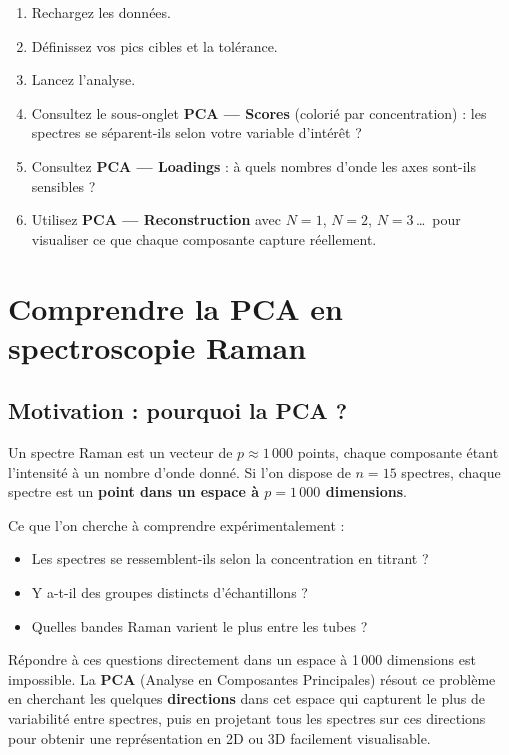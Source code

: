 \documentclass[12pt, a4paper]{article}
\begin{document}
\begin{enumerate}
  \item Rechargez les données.
  \item Définissez vos pics cibles et la tolérance.
  \item Lancez l'analyse.
  \item Consultez le sous-onglet \textbf{PCA --- Scores} (colorié par
        concentration) : les spectres se séparent-ils selon votre variable
        d'intérêt ?
  \item Consultez \textbf{PCA --- Loadings} : à quels nombres d'onde les axes
        sont-ils sensibles ?
  \item Utilisez \textbf{PCA --- Reconstruction} avec $N = 1$, $N = 2$,
        $N = 3$\,\ldots\ pour visualiser ce que chaque composante capture
        réellement.
\end{enumerate}

\section{Comprendre la PCA en spectroscopie Raman}
\label{sec:pca}

\subsection{Motivation : pourquoi la PCA ?}

Un spectre Raman est un vecteur de $p \approx 1\,000$ points, chaque
composante étant l'intensité à un nombre d'onde donné. Si l'on dispose de
$n = 15$ spectres, chaque spectre est un \textbf{point dans un espace à
$p = 1\,000$ dimensions}.

\medskip

Ce que l'on cherche à comprendre expérimentalement :

\begin{itemize}
  \item Les spectres se ressemblent-ils selon la concentration en titrant ?
  \item Y a-t-il des groupes distincts d'échantillons ?
  \item Quelles bandes Raman varient le plus entre les tubes ?
\end{itemize}

Répondre à ces questions directement dans un espace à 1\,000 dimensions est
impossible. La \textbf{PCA} (Analyse en Composantes Principales) résout ce
problème en cherchant les quelques \textbf{directions} dans cet espace qui
capturent le plus de variabilité entre spectres, puis en projetant tous les
spectres sur ces directions pour obtenir une représentation en 2D ou 3D
facilement visualisable.
\end{document}
